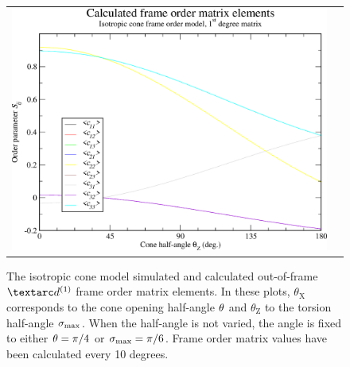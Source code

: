 \begin{figure}
\begin{tabular}{@{}cc@{}}
    \includegraphics[width=.5\textwidth]{images/frame_order_matrix/Sij_iso_cone_out_of_frame_theta_z_calc.eps} \\
  \end{tabular}
  \caption[Isotropic cone simulated and calculated out-of-frame Daeg$^{(1)}$ elements.]{
    The isotropic cone model simulated and calculated out-of-frame $\FOone$ frame order matrix elements.
    In these plots, $\theta_\textrm{X}$ corresponds to the cone opening half-angle $\theta$ and $\theta_\textrm{Z}$ to the torsion half-angle $\sigma_\textrm{max}$.
    When the half-angle is not varied, the angle is fixed to either $\theta = \pi/4$ or $\sigma_\textrm{max} = \pi/6$.
    Frame order matrix values have been calculated every 10 degrees.
  }
  \label{fig: simulated and calculated out-of-frame 1st degree iso cone frame order}
\end{figure}

